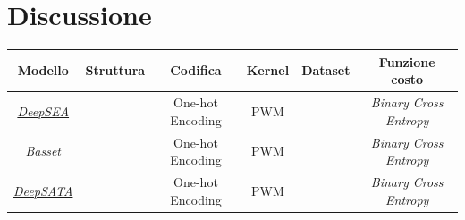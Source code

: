 
\chapter{Discussione}\label{chp:discussion}

\begin{table}[!h]
    \centering
    \renewcommand{\arraystretch}{2}
    \begin{tabular}{|c|c|c|c|c|c|} %
        \hline %
        \textbf{Modello} & \textbf{Struttura} & \textbf{Codifica} & \textbf{Kernel} & \textbf{Dataset} & \textbf{Funzione costo}\\ 
        \hline\hline %
        \hyperref[sec:DeepSEA]{\textsl{DeepSEA}} & & One-hot Encoding & \acs{PWM} & & \textsl{Binary Cross Entropy} \\ 
        \hyperref[sec:Basset]{\textsl{Basset}} & & One-hot Encoding & \acs{PWM} & & \textsl{Binary Cross Entropy} \\ 
        \hyperref[sec:DeepSATA]{\textsl{DeepSATA}} & & One-hot Encoding & \acs{PWM} & & \textsl{Binary Cross Entropy} \\ 
        \hline
    \end{tabular}
    \renewcommand{\arraystretch}{1}
\end{table}





